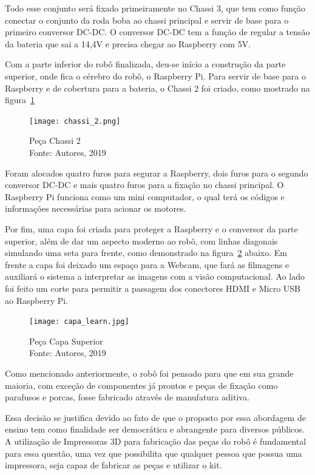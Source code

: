 Todo esse conjunto será fixado primeiramente no Chassi 3, que tem como função conectar o conjunto da roda boba ao chassi principal e servir de base para o primeiro conversor DC-DC. O conversor DC-DC tem a função de regular a tensão da bateria que sai a 14,4V e precisa chegar ao Raspberry com 5V.

Com a parte inferior do robô finalizada, deu-se início a construção da parte superior, onde fica o cérebro do robô, o Raspberry Pi. Para servir de base para o Raspberry e de cobertura para a bateria, o Chassi 2 foi criado, como mostrado na figura~\ref{fig:chassi_2}

\begin{figure}[h!]
	\centering
	\texttt{[image: chassi\_2.png]}\\
	\caption{Peça Chassi 2 \\ Fonte: Autores, 2019}
	\label{fig:chassi_2}
\end{figure}

Foram alocados quatro furos para segurar a Raspberry, dois furos para o segundo conversor DC-DC e mais quatro furos para a fixação no chassi principal. O Raspberry Pi funciona como um mini computador, o qual terá os códigos e informações necessárias para acionar os
motores.

Por fim, uma capa foi criada para proteger a Raspberry e o conversor da parte superior, além de dar um aspecto moderno ao robô, com linhas diagonais simulando uma seta para frente, como demonstrado na figura~\ref{fig:capa_learn} abaixo. Em frente a capa foi deixado um espaço para a Webcam, que fará as filmagens e auxiliará o sistema a interpretar as imagens com a visão computacional. Ao lado foi feito um corte para permitir a passagem dos conectores HDMI e Micro USB ao Raspberry Pi.

\begin{figure}[h!]
	\centering
	\texttt{[image: capa\_learn.jpg]}\\
	\caption{Peça Capa Superior \\ Fonte: Autores, 2019}
	\label{fig:capa_learn}
\end{figure}

Como mencionado anteriormente, o robô foi pensado para que em sua grande maioria, com exceção de componentes já prontos e peças de fixação como parafusos e porcas, fosse fabricado através de manufatura aditiva.

Essa decisão se justifica devido ao fato de que o proposto por essa abordagem de ensino tem como finalidade ser democrática e abrangente para diversos públicos. A utilização de Impressoras 3D para fabricação das peças do robô é fundamental para essa questão, uma vez que possibilita que qualquer pessoa que possua uma impressora, seja capaz de fabricar as peças e utilizar o kit.

